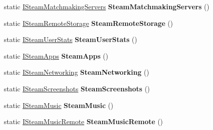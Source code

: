 \begin{DoxyCompactItemize}
static \hyperlink{class_valve_1_1_steamworks_1_1_i_steam_matchmaking_servers}{I\+Steam\+Matchmaking\+Servers} {\bfseries Steam\+Matchmaking\+Servers} ()
\item 
\mbox{\label{class_valve_1_1_steamworks_1_1_steam_a_p_i_ab6feb51208989e1a8556b2eb2463057f}} 
static \hyperlink{class_valve_1_1_steamworks_1_1_i_steam_remote_storage}{I\+Steam\+Remote\+Storage} {\bfseries Steam\+Remote\+Storage} ()
\item 
\mbox{\label{class_valve_1_1_steamworks_1_1_steam_a_p_i_ad0d2d6abfc3d9f871e18a577eff4785c}} 
static \hyperlink{class_valve_1_1_steamworks_1_1_i_steam_user_stats}{I\+Steam\+User\+Stats} {\bfseries Steam\+User\+Stats} ()
\item 
\mbox{\label{class_valve_1_1_steamworks_1_1_steam_a_p_i_a7facdfa3270ae3d4e129af43cffdb305}} 
static \hyperlink{class_valve_1_1_steamworks_1_1_i_steam_apps}{I\+Steam\+Apps} {\bfseries Steam\+Apps} ()
\item 
\mbox{\label{class_valve_1_1_steamworks_1_1_steam_a_p_i_ad1e97e70405aab728b0b39693bf5a4ec}} 
static \hyperlink{class_valve_1_1_steamworks_1_1_i_steam_networking}{I\+Steam\+Networking} {\bfseries Steam\+Networking} ()
\item 
\mbox{\label{class_valve_1_1_steamworks_1_1_steam_a_p_i_a39abf12cf370fce9cc5d38ebaeeb4e82}} 
static \hyperlink{class_valve_1_1_steamworks_1_1_i_steam_screenshots}{I\+Steam\+Screenshots} {\bfseries Steam\+Screenshots} ()
\item 
\mbox{\label{class_valve_1_1_steamworks_1_1_steam_a_p_i_a15d8b9bdf1491c05ea398c12587f4f1e}} 
static \hyperlink{class_valve_1_1_steamworks_1_1_i_steam_music}{I\+Steam\+Music} {\bfseries Steam\+Music} ()
\item 
\mbox{\label{class_valve_1_1_steamworks_1_1_steam_a_p_i_a72ce45ae79e543055055595ee9169c7f}} 
static \hyperlink{class_valve_1_1_steamworks_1_1_i_steam_music_remote}{I\+Steam\+Music\+Remote} {\bfseries Steam\+Music\+Remote} ()

\end{DoxyCompactItemize}
